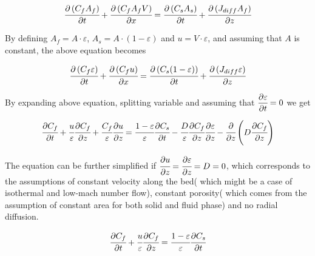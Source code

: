 \documentclass[../Parameter_fitting.tex]{subfiles}
\begin{document}
	{\footnotesize
		\begin{equation}
			\cfrac{\partial \left( C_f A_f \right)}{\partial t} + \cfrac{\partial \left( C_f A_f V \right)}{\partial x} = \cfrac{\partial \left( C_s A_s \right) }{\partial t} + \cfrac{\partial \left( J_{diff} A_f \right) }{\partial z}
		\end{equation}
	}

	By defining $A_f = A \cdot \varepsilon$, $A_s = A \cdot \left( 1-\varepsilon \right)$ and $u=V \cdot \varepsilon$, and assuming that $A$ is constant, the above equation becomes
	
	{\footnotesize
		\begin{equation}
			\cfrac{\partial \left( C_f \varepsilon \right)}{\partial t} + \cfrac{\partial \left( C_f u\right)}{\partial x} = \cfrac{\partial \left( C_s (1-\varepsilon) \right) }{\partial t} + \cfrac{\partial \left( J_{diff} \varepsilon \right) }{\partial z}
		\end{equation}
	}

	By expanding above equation, splitting variable and assuming that ${\footnotesize \cfrac{\partial \varepsilon}{\partial t}=0}$ we get
	
	{\footnotesize
		\begin{equation}
			\cfrac{\partial C_f}{\partial t} + \cfrac{u}{\varepsilon} \cfrac{\partial C_f}{\partial z} + \cfrac{C_f}{\varepsilon} \cfrac{\partial u}{\partial z} = \cfrac{1-\varepsilon}{\varepsilon} \cfrac{\partial C_s}{\partial t} - \cfrac{D}{\varepsilon} \cfrac{\partial C_f}{\partial z} \cfrac{\partial \varepsilon}{\partial z} - \cfrac{\partial}{\partial z} \left( D \cfrac{\partial C_f}{\partial z} \right)
		\end{equation}
	}
	
	The equation can be further simplified if $\cfrac{\partial u}{\partial z} = \cfrac{\partial \varepsilon}{\partial z} = D = 0$, which corresponds to the assumptions of constant velocity along the bed( which might be a case of isothermal and low-mach number flow), constant porosity( which comes from the assumption of constant area for both solid and fluid phase) and no radial diffusion.
	
	{\footnotesize
		\begin{equation}
			\cfrac{\partial C_f}{\partial t} + \cfrac{u}{\varepsilon} \cfrac{\partial C_f}{\partial z}  = \cfrac{1-\varepsilon}{\varepsilon} \cfrac{\partial C_s}{\partial t} 
			\label{EQ: Simplified_Species_Conservation}
		\end{equation}
	}
\end{document}
